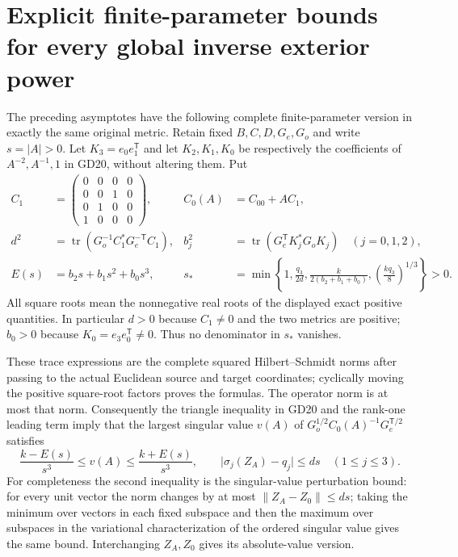 \section{Explicit finite-parameter bounds for every global inverse exterior power}
The preceding asymptotes have the following complete
finite-parameter version in exactly the same original metric.
Retain fixed $B,C,D,G_e,G_o$ and write $s=|A|>0$.
Let $K_3=e_0e_1^{\mathsf T}$ and let $K_2,K_1,K_0$
be respectively the coefficients of $A^{-2},A^{-1},1$
in GD20, without altering them. Put
\begin{equation}
\begin{aligned}
 C_1&=\begin{pmatrix}0&0&0&0\\0&0&1&0\\0&1&0&0\\1&0&0&0\end{pmatrix},
 &C_0(A)&=C_{00}+AC_1,\\
 d^2&=\operatorname{tr}(G_o^{-1}C_1^*G_e^{-\mathsf T}C_1),&
 b_j^2&=\operatorname{tr}(G_e^{\mathsf T}K_j^*G_oK_j)\quad(j=0,1,2),\\
 E(s)&=b_2s+b_1s^2+b_0s^3,&
 s_*&=\min\left\{1,\frac{q_3}{2d},
 \frac{k}{2(b_2+b_1+b_0)},\left(\frac{kq_3}{8}\right)^{1/3}\right\}>0.
\end{aligned}\tag{GD26}
\end{equation}
All square roots mean the nonnegative real roots of the
displayed exact positive quantities. In particular $d>0$
because $C_1\ne0$ and the two metrics are positive;
$b_0>0$ because $K_0=e_3e_0^{\mathsf T}\ne0$.
Thus no denominator in $s_*$ vanishes.

These trace expressions are the complete squared
Hilbert--Schmidt norms after passing to the actual
Euclidean source and target coordinates; cyclically
moving the positive square-root factors proves the
formulas. The operator norm is at most that norm.
Consequently the triangle inequality in GD20 and
the rank-one leading term imply that the largest
singular value $v(A)$ of
$G_o^{1/2}C_0(A)^{-1}G_e^{\mathsf T/2}$ satisfies
\begin{equation}
 \frac{k-E(s)}{s^3}\le v(A)\le\frac{k+E(s)}{s^3},\qquad
 \big|\sigma_j(Z_A)-q_j\big|\le ds\quad(1\le j\le3).
 \tag{GD27}
\end{equation}
For completeness the second inequality is the singular-value
perturbation bound: for every unit vector the norm changes
by at most $\|Z_A-Z_0\|\le ds$; taking the minimum over
vectors in each fixed subspace and then the maximum over
subspaces in the variational characterization of the
ordered singular value gives the same bound. Interchanging
$Z_A,Z_0$ gives its absolute-value version.

